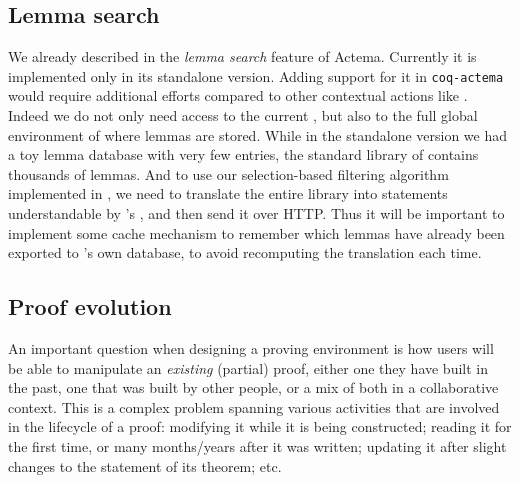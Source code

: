 \subsection{Lemma search}

We already described in  the \emph{lemma search} feature of
Actema. Currently it is implemented only in its standalone version. Adding
support for it in \texttt{coq-actema} would require additional efforts compared
to other contextual actions like . Indeed we do not only need
access to the current , but also to the full global environment of  where
lemmas are stored. While in the standalone version we had a toy lemma database
with very few entries, the standard library of  contains thousands of lemmas.
And to use our selection-based filtering algorithm implemented in , we
need to translate the entire library into statements understandable by 's
, and then send it over HTTP. Thus it will be important to
implement some cache mechanism to remember which lemmas have already been
exported to 's own database, to avoid recomputing the translation each
time.



\subsection{Proof evolution}

\AP
An important question when designing a proving environment is how users will be
able to manipulate an \emph{existing} (partial) proof, either one they have
built in the past, one that was built by other people, or a mix of both in a
collaborative context. This is a complex problem spanning various activities
that are involved in the lifecycle of a proof: modifying it while it is being
constructed; reading it for the first time, or many months/years after it was
written; updating it after slight changes to the statement of its theorem;
etc.

